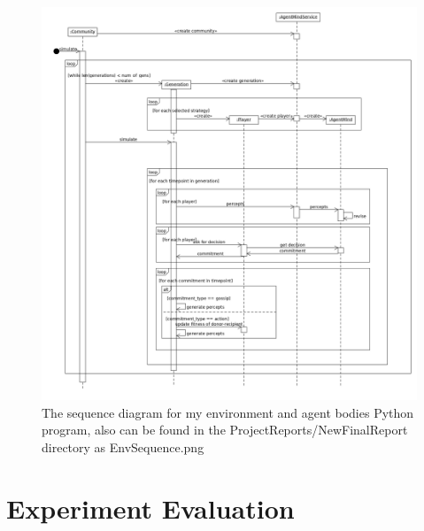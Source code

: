 \documentclass[]{final_report}
\begin{document}
\begin{figure}
	\begin{center}
	\includegraphics[width=\textwidth]{EnvSequence.png}
	\caption{The sequence diagram for my environment and agent bodies Python program, also can be found in the ProjectReports/NewFinalReport directory as EnvSequence.png}
	\label{fig:sequence}
	\end{center}
\end{figure}



\chapter{Experiment Evaluation}
\label{chap:exp}
\end{document}
